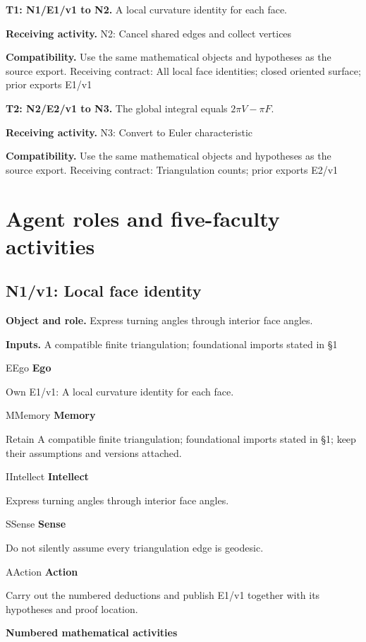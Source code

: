 \documentclass[preprint,12pt,aps,pra,showkeys,amsmath,amssymb,superscriptaddress,floatfix]{revtex4-2}
\theoremstyle{definition}
\theoremstyle{remark}
\newcommand{\mmfaculty}[3]{%
 \begin{mmfacultybox}{#1}{#2}
 {\sffamily\bfseries\color{MMBlue}#2}\par\smallskip #3
 \end{mmfacultybox}}
\newcommand{\field}[2]{\par\smallskip\noindent\textbf{#1.} #2\par}
\begin{document}
\field{T1: N1/E1/v1 to N2}{A local curvature identity for each face.}

\field{Receiving activity}{N2: Cancel shared edges and collect vertices}

\field{Compatibility}{Use the same mathematical objects and hypotheses as the source export.
Receiving contract: All local face identities; closed oriented surface;
prior exports E1/v1}

\field{T2: N2/E2/v1 to N3}{The global integral equals \(2\pi V-\pi F\).}

\field{Receiving activity}{N3: Convert to Euler characteristic}

\field{Compatibility}{Use the same mathematical objects and hypotheses as the source export.
Receiving contract: Triangulation counts; prior exports E2/v1}

\endgroup

\clearpage\section{Agent roles and five-faculty activities}\begingroup\small\linespread{1.05}\selectfont{}

\subsection{N1/v1: Local face identity}

\field{Object and role}{Express turning angles through interior face angles.}

\field{Inputs}{A compatible finite triangulation; foundational imports stated in §1}

\mmfaculty{E}{Ego}{Own E1/v1: A local curvature identity for each face.}

\mmfaculty{M}{Memory}{Retain A compatible finite triangulation; foundational imports stated in
§1; keep their assumptions and versions attached.}

\mmfaculty{I}{Intellect}{Express turning angles through interior face angles.}

\mmfaculty{S}{Sense}{Do not silently assume every triangulation edge is geodesic.}

\mmfaculty{A}{Action}{Carry out the numbered deductions and publish E1/v1 together with its
hypotheses and proof location.}

\smallskip\noindent\textbf{Numbered mathematical activities}
\end{document}
